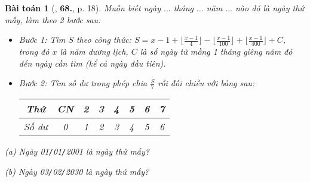 \documentclass{article}
\numberwithin{equation}{section}
\newtheorem{baitoan}{Bài toán}[section]
\begin{document}
\begin{baitoan}[\cite{Tuyen_Toan_7}, \textbf{68.}, p. 18]
	Muốn biết ngày $\ldots$ tháng $\ldots$ năm $\ldots$ nào đó là ngày thứ mấy, làm theo 2 bước sau:
	\begin{itemize}
		\item \textit{Bước 1}: Tìm $S$ theo công thức: $S = x - 1 + \lfloor\frac{x - 1}{4}\rfloor -  \lfloor\frac{x - 1}{100}\rfloor + \lfloor\frac{x - 1}{400}\rfloor + C$, trong đó $x$ là năm dương lịch, $C$ là số ngày từ mồng 1 tháng giêng năm đó đến ngày cần tìm (kể cả ngày đầu tiên).
		\item \textit{Bước 2}: Tìm số dư trong phép chia $\frac{S}{7}$ rồi đối chiều với bảng sau:
		
		\begin{table}[H]
			\centering
			\begin{tabular}{|c|c|c|c|c|c|c|c|}
				\hline
				Thứ & CN & 2 & 3 & 4 & 5 & 6 & 7 \\
				\hline
				Số dư & 0 & 1 & 2 & 3 & 4 & 5 & 6 \\
				\hline
			\end{tabular}
		\end{table}
	\end{itemize}
	\begin{enumerate*}
		\item[(a)] Ngày \emph{01\texttt{/}01\texttt{/}2001} là ngày thứ mấy?
		\item[(b)] Ngày \emph{03\texttt{/}02\texttt{/}2030} là ngày thứ mấy?
	\end{enumerate*}
\end{baitoan}




\printbibliography[heading=bibintoc]
	
\end{document}
